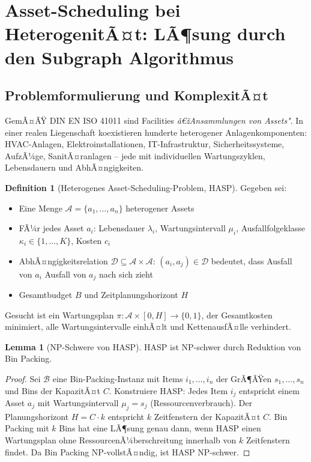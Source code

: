 ﻿\documentclass[a4paper,12pt]{article}
\theoremstyle{definition}
\newtheorem{definition}{Definition}[section]
\newtheorem{lemma}{Lemma}[section]
\begin{document}
\section{Asset-Scheduling bei HeterogenitÃ¤t: LÃ¶sung durch den Subgraph Algorithmus}
\label{sec:asset}

\subsection{Problemformulierung und KomplexitÃ¤t}

GemÃ¤ÃŸ DIN EN ISO 41011 sind Facilities \emph{â€žAnsammlungen von Assets"}.
In einer realen Liegenschaft koexistieren hunderte heterogener Anlagenkomponenten:
HVAC-Anlagen, Elektroinstallationen, IT-Infrastruktur, Sicherheitssysteme, AufzÃ¼ge,
SanitÃ¤ranlagen -- jede mit individuellen Wartungszyklen, Lebensdauern und AbhÃ¤ngigkeiten.

\begin{definition}[Heterogenes Asset-Scheduling-Problem, HASP]
\label{def:hasp}
Gegeben sei:
\begin{itemize}
    \item Eine Menge $\mathcal{A} = \{a_1, \ldots, a_n\}$ heterogener Assets
    \item FÃ¼r jedes Asset $a_i$: Lebensdauer $\lambda_i$, Wartungsintervall $\mu_i$,
          Ausfallfolgeklasse $\kappa_i \in \{1,\ldots,K\}$, Kosten $c_i$
    \item AbhÃ¤ngigkeitsrelation $\mathcal{D} \subseteq \mathcal{A} \times \mathcal{A}$:
          $(a_i, a_j) \in \mathcal{D}$ bedeutet, dass Ausfall von $a_i$ Ausfall von $a_j$
          nach sich zieht
    \item Gesamtbudget $B$ und Zeitplanungshorizont $H$
\end{itemize}
Gesucht ist ein Wartungsplan $\pi: \mathcal{A} \times [0,H] \to \{0,1\}$,
der Gesamtkosten minimiert, alle Wartungsintervalle einhÃ¤lt und KettenausfÃ¤lle verhindert.
\end{definition}

\begin{lemma}[NP-Schwere von HASP]
\label{lem:hasp-np}
HASP ist NP-schwer durch Reduktion von Bin Packing.
\end{lemma}

\begin{proof}
Sei $\mathcal{B}$ eine Bin-Packing-Instanz mit Items $i_1, \ldots, i_n$ der GrÃ¶ÃŸen
$s_1, \ldots, s_n$ und Bins der KapazitÃ¤t $C$.
Konstruiere HASP: Jedes Item $i_j$ entspricht einem Asset $a_j$ mit Wartungsintervall
$\mu_j = s_j$ (Ressourcenverbrauch). Der Planungshorizont $H = C \cdot k$ entspricht
$k$ Zeitfenstern der KapazitÃ¤t $C$.
Bin Packing mit $k$ Bins hat eine LÃ¶sung genau dann, wenn HASP einen Wartungsplan
ohne RessourcenÃ¼berschreitung innerhalb von $k$ Zeitfenstern findet.
Da Bin Packing NP-vollstÃ¤ndig, ist HASP NP-schwer.
\end{proof}
\end{document}
